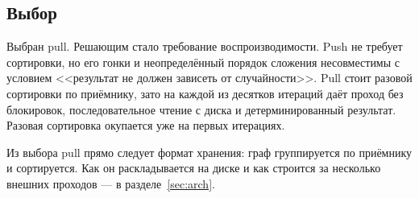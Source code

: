\subsection{Выбор}
Выбран pull. Решающим стало требование воспроизводимости. Push не требует сортировки, но его гонки и
неопределённый порядок сложения несовместимы с условием <<результат не должен зависеть от
случайности>>. Pull стоит разовой сортировки по приёмнику, зато на каждой из десятков итераций даёт
проход без блокировок, последовательное чтение с диска и детерминированный результат. Разовая
сортировка окупается уже на первых итерациях.

Из выбора pull прямо следует формат хранения: граф группируется по приёмнику и сортируется. Как он
раскладывается на диске и как строится за несколько внешних проходов --- в разделе~\ref{sec:arch}.
